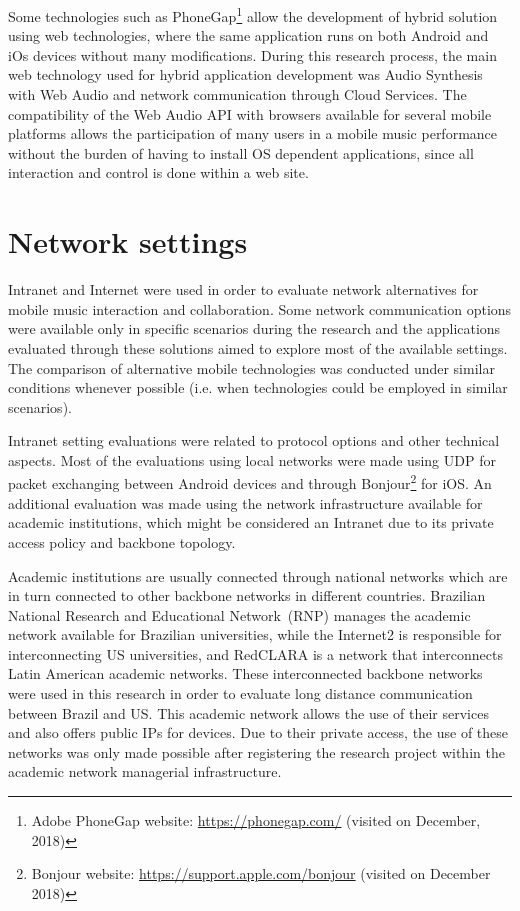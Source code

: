Some technologies such as PhoneGap\footnote{Adobe PhoneGap website: \url{https://phonegap.com/} (visited on December, 2018)} allow the development of hybrid solution using web technologies, where the same application runs on both Android and iOs devices without many modifications.
During this research process, the main web technology used for hybrid application development was Audio Synthesis with Web Audio and network communication through Cloud Services.
The compatibility of the Web Audio API with browsers available for several mobile platforms allows the participation of many users in a mobile music performance without the burden of having to install OS dependent applications, since all interaction and control is done within a web site.


\section{Network settings}

Intranet and Internet were used in order to evaluate network alternatives for mobile music interaction and collaboration.
Some network communication options were available only in specific scenarios during the research and the applications evaluated through these solutions aimed to explore most of the available settings.
The comparison of alternative mobile technologies was conducted under similar conditions whenever possible (i.e. when technologies could be employed in similar scenarios).

Intranet setting evaluations were related to protocol options and other technical aspects.
Most of the evaluations using local networks were made using UDP for packet exchanging between Android devices and through Bonjour\footnote{Bonjour website: \url{https://support.apple.com/bonjour} (visited on December 2018)} for iOS.
An additional evaluation was made using the network infrastructure available for academic institutions, which might be considered an Intranet due to its private access policy and backbone topology.

Academic institutions are usually connected through national networks which are in turn connected to other backbone networks in different countries.
Brazilian National Research and Educational Network~(RNP) manages the academic network available for Brazilian universities, while the Internet2 is responsible for interconnecting US universities, and RedCLARA is a network that interconnects Latin American academic networks.
These interconnected backbone networks were used in this research in order to evaluate long distance communication between Brazil and US.
This academic network allows the use of their services and also offers public IPs for devices.
Due to their private access, the use of these networks was only made possible after registering the research project within the academic network managerial infrastructure.

